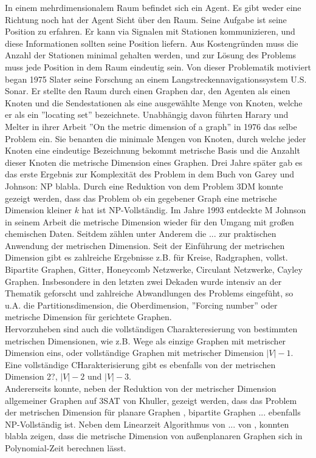 In einem mehrdimensionalem Raum befindet sich ein Agent. Es gibt weder eine Richtung noch hat der Agent Sicht über den Raum. Seine Aufgabe ist seine Position zu erfahren. Er kann via Signalen mit Stationen kommunizieren, und diese Informationen sollten seine Position liefern. Aus Kostengründen muss die Anzahl der Stationen minimal gehalten werden, und zur Lösung des Problems muss jede Position in dem Raum eindeutig sein.\newline\newline 
Von dieser Problematik motiviert began 1975 Slater seine Forschung an einem Langstreckennavigationssystem U.S. Sonar. Er stellte den Raum durch einen Graphen dar, den Agenten als einen Knoten und die Sendestationen als eine ausgewählte Menge von Knoten, welche er als ein ''locating set'' bezeichnete. Unabhängig davon führten Harary und Melter in ihrer Arbeit ''On the metric dimension of a graph'' in 1976 das selbe Problem ein. Sie benanten die minimale Mengen von Knoten, durch welche jeder Knoten eine eindeutige Bezeichnung bekommt metrische Basis und die Anzahlt dieser Knoten die metrische Dimension eines Graphen.\newline
Drei Jahre später gab es das erste Ergebnis zur Komplexität des Problem in dem Buch von Garey und Johnson: NP blabla. Durch eine Reduktion von dem Problem 3DM konnte gezeigt werden, dass das Problem ob ein gegebener Graph eine metrische Dimension kleiner $k$ hat ist NP-Vollständig. Im Jahre 1993 entdeckte M Johnson in seinem Arbeit die metrische Dimension wieder für den Umgang mit großen chemischen Daten. Seitdem zählen unter Anderem die ... zur praktischen Anwendung der metrischen Dimension. \newline
Seit der Einführung der metrischen Dimension gibt es zahlreiche Ergebnisse z.B. für Kreise, Radgraphen, vollst. Bipartite Graphen, Gitter, Honeycomb Netzwerke, Circulant Netzwerke, Cayley Graphen. Insbesondere in den letzten zwei Dekaden wurde intensiv an der Thematik geforscht und zahlreiche Abwandlungen des Problems eingefüht, so u.A. die Partitionsdimension, die Oberdimension, ''Forcing number'' oder metrische Dimension für gerichtete Graphen. \\Hervorzuheben sind auch die vollständigen Charakteresierung von bestimmten metrischen Dimensionen, wie z.B. Wege als einzige Graphen mit metrischer Dimension eins, oder vollständige Graphen mit metrischer Dimension $|V|-1$. Eine vollständige CHarakterisierung gibt es ebenfalls von der metrischen Dimension 2?, $|V|-2$ und $|V|-3$.\\Andererseits konnte, neben der Reduktion von der metrischer Dimension allgemeiner Graphen auf 3SAT von Khuller, gezeigt werden, dass das Problem der metrischen Dimension für planare Graphen \cite{}, bipartite Graphen\cite{} ... ebenfalls NP-Vollständig ist. Neben dem Linearzeit Algorithmus von ... von \cite{},\cite{} konnten blabla zeigen, dass die metrische Dimension von außenplanaren Graphen sich in Polynomial-Zeit berechnen lässt.

